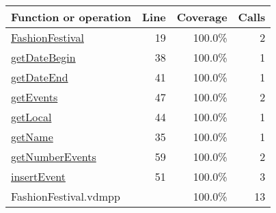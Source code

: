 \begin{longtable}{|l|r|r|r|}
\hline
Function or operation & Line & Coverage & Calls \\
\hline
\hline
\hyperref[FashionFestival:19]{FashionFestival} & 19&100.0\% & 2 \\
\hline
\hyperref[getDateBegin:38]{getDateBegin} & 38&100.0\% & 1 \\
\hline
\hyperref[getDateEnd:41]{getDateEnd} & 41&100.0\% & 1 \\
\hline
\hyperref[getEvents:47]{getEvents} & 47&100.0\% & 2 \\
\hline
\hyperref[getLocal:44]{getLocal} & 44&100.0\% & 1 \\
\hline
\hyperref[getName:35]{getName} & 35&100.0\% & 1 \\
\hline
\hyperref[getNumberEvents:59]{getNumberEvents} & 59&100.0\% & 2 \\
\hline
\hyperref[insertEvent:51]{insertEvent} & 51&100.0\% & 3 \\
\hline
\hline
FashionFestival.vdmpp & & 100.0\% & 13 \\
\hline
\end{longtable}

